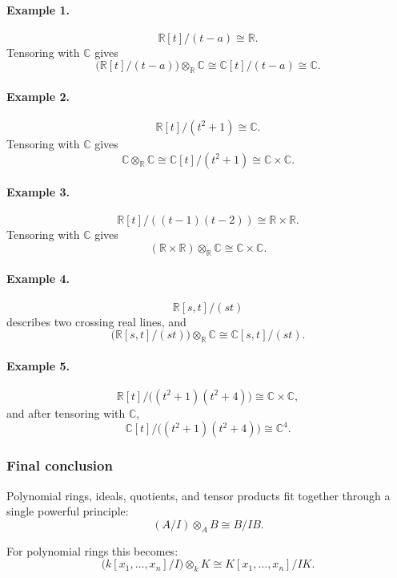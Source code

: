 \documentclass[12pt,a4paper]{article}
\theoremstyle{notespace}
\theoremstyle{definition}
\begin{document}
\paragraph{Example 1.}
\[
\mathbb{R}[t]/(t-a)\cong \mathbb{R}.
\]
Tensoring with \(\mathbb{C}\) gives
\[
\bigl(\mathbb{R}[t]/(t-a)\bigr)\otimes_{\mathbb{R}}\mathbb{C}
\cong
\mathbb{C}[t]/(t-a)
\cong
\mathbb{C}.
\]

\paragraph{Example 2.}
\[
\mathbb{R}[t]/(t^2+1)\cong \mathbb{C}.
\]
Tensoring with \(\mathbb{C}\) gives
\[
\mathbb{C}\otimes_{\mathbb{R}}\mathbb{C}
\cong
\mathbb{C}[t]/(t^2+1)
\cong
\mathbb{C}\times \mathbb{C}.
\]

\paragraph{Example 3.}
\[
\mathbb{R}[t]/((t-1)(t-2))\cong \mathbb{R}\times \mathbb{R}.
\]
Tensoring with \(\mathbb{C}\) gives
\[
(\mathbb{R}\times\mathbb{R})\otimes_{\mathbb{R}}\mathbb{C}
\cong
\mathbb{C}\times \mathbb{C}.
\]

\paragraph{Example 4.}
\[
\mathbb{R}[s,t]/(st)
\]
describes two crossing real lines, and
\[
\bigl(\mathbb{R}[s,t]/(st)\bigr)\otimes_{\mathbb{R}}\mathbb{C}
\cong
\mathbb{C}[s,t]/(st).
\]

\paragraph{Example 5.}
\[
\mathbb{R}[t]/\bigl((t^2+1)(t^2+4)\bigr)\cong \mathbb{C}\times \mathbb{C},
\]
and after tensoring with \(\mathbb{C}\),
\[
\mathbb{C}[t]/\bigl((t^2+1)(t^2+4)\bigr)\cong \mathbb{C}^4.
\]

\subsubsection{Final conclusion}

Polynomial rings, ideals, quotients, and tensor products fit together through a single powerful principle:
\[
(A/I)\otimes_A B \cong B/IB.
\]

For polynomial rings this becomes:
\[
\bigl(k[x_1,\dots,x_n]/I\bigr)\otimes_k K
\cong
K[x_1,\dots,x_n]/IK.
\]
\end{document}
